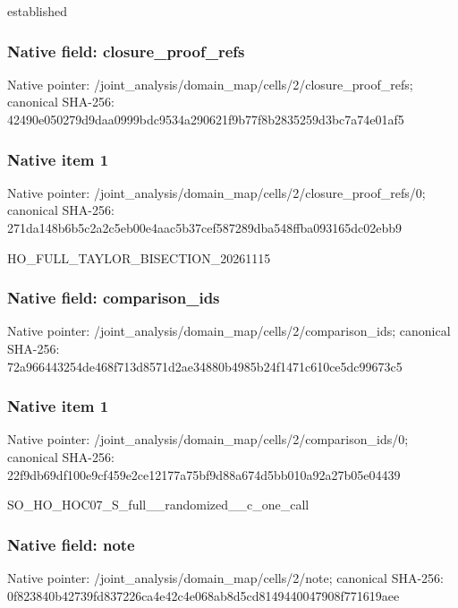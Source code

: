 \documentclass[10pt,a4paper]{article}
\begin{document}
\begingroup\raggedright\sloppy established\par\endgroup

\subsubsection{Native field: closure\_\allowbreak{}proof\_\allowbreak{}refs}
Native pointer: /joint\_\allowbreak{}analysis/domain\_\allowbreak{}map/cells/2/closure\_\allowbreak{}proof\_\allowbreak{}refs; canonical SHA-256: 42490e050279d9daa0999bdc9534a290621f9b77f8b2835259d3bc7a74e01af5

\subsubsection{Native item 1}
Native pointer: /joint\_\allowbreak{}analysis/domain\_\allowbreak{}map/cells/2/closure\_\allowbreak{}proof\_\allowbreak{}refs/0; canonical SHA-256: 271da148b6b5c2a2c5eb00e4aac5b37cef587289dba548ffba093165dc02ebb9

\begingroup\raggedright\sloppy HO\_\allowbreak{}FULL\_\allowbreak{}TAYLOR\_\allowbreak{}BISECTION\_\allowbreak{}20261115\par\endgroup

\subsubsection{Native field: comparison\_\allowbreak{}ids}
Native pointer: /joint\_\allowbreak{}analysis/domain\_\allowbreak{}map/cells/2/comparison\_\allowbreak{}ids; canonical SHA-256: 72a966443254de468f713d8571d2ae34880b4985b24f1471c610ce5dc99673c5

\subsubsection{Native item 1}
Native pointer: /joint\_\allowbreak{}analysis/domain\_\allowbreak{}map/cells/2/comparison\_\allowbreak{}ids/0; canonical SHA-256: 22f9db69df100e9cf459e2ce12177a75bf9d88a674d5bb010a92a27b05e04439

\begingroup\raggedright\sloppy SO\_\allowbreak{}HO\_\allowbreak{}HOC07\_\allowbreak{}S\_\allowbreak{}full\_\allowbreak{}\_\allowbreak{}randomized\_\allowbreak{}\_\allowbreak{}c\_\allowbreak{}one\_\allowbreak{}call\par\endgroup

\subsubsection{Native field: note}
Native pointer: /joint\_\allowbreak{}analysis/domain\_\allowbreak{}map/cells/2/note; canonical SHA-256: 0f823840b42739fd837226ca4e42c4e068ab8d5cd8149440047908f771619aee
\end{document}

